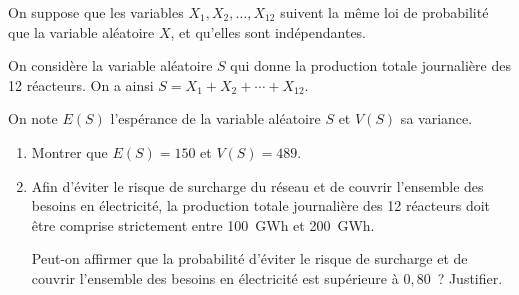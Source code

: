 \begin{enumerate}
On suppose que les variables $X_1, X_2, \ldots, X_{12}$ suivent la même loi de probabilité que la variable aléatoire $X$, et qu'elles sont indépendantes.

On considère la variable aléatoire $S$ qui donne la production totale journalière des 12 réacteurs. On a ainsi $S = X_1 + X_2 + \cdots + X_{12}$.

On note $E(S)$ l'espérance de la variable aléatoire $S$ et $V(S)$ sa variance.

\begin{enumerate}[label=\textbf{\alph*.}]
\item Montrer que $E(S) = 150$ et $V(S) = 489$.
\item Afin d'éviter le risque de surcharge du réseau et de couvrir l'ensemble des besoins en électricité, la production totale journalière des 12 réacteurs doit être comprise strictement entre 100~GWh et 200~GWh.

Peut-on affirmer que la probabilité d'éviter le risque de surcharge et de couvrir l'ensemble des besoins en électricité est supérieure à $0,80$~? Justifier.
\end{enumerate}
\end{enumerate}
